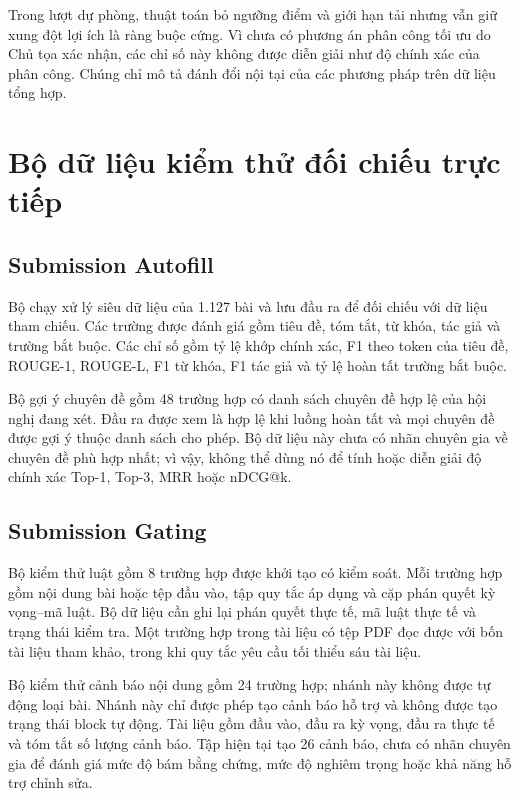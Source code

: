 Trong lượt dự phòng, thuật toán bỏ ngưỡng điểm và giới hạn tải nhưng vẫn giữ xung đột lợi ích là ràng buộc cứng. Vì chưa có phương án phân công tối ưu do Chủ tọa xác nhận, các chỉ số này không được diễn giải như độ chính xác của phân công. Chúng chỉ mô tả đánh đổi nội tại của các phương pháp trên dữ liệu tổng hợp.

\section{Bộ dữ liệu kiểm thử đối chiếu trực tiếp}
\label{appc:direct-fixtures}

\subsection{Submission Autofill}

Bộ chạy xử lý siêu dữ liệu của 1.127 bài và lưu đầu ra để đối chiếu với dữ liệu tham chiếu. Các trường được đánh giá gồm tiêu đề, tóm tắt, từ khóa, tác giả và trường bắt buộc. Các chỉ số gồm tỷ lệ khớp chính xác, F1 theo token của tiêu đề, ROUGE-1, ROUGE-L, F1 từ khóa, F1 tác giả và tỷ lệ hoàn tất trường bắt buộc.

Bộ gợi ý chuyên đề gồm 48 trường hợp có danh sách chuyên đề hợp lệ của hội nghị đang xét. Đầu ra được xem là hợp lệ khi luồng hoàn tất và mọi chuyên đề được gợi ý thuộc danh sách cho phép. Bộ dữ liệu này chưa có nhãn chuyên gia về chuyên đề phù hợp nhất; vì vậy, không thể dùng nó để tính hoặc diễn giải độ chính xác Top-1, Top-3, MRR hoặc nDCG@k.

\subsection{Submission Gating}

Bộ kiểm thử luật gồm 8 trường hợp được khởi tạo có kiểm soát. Mỗi trường hợp gồm nội dung bài hoặc tệp đầu vào, tập quy tắc áp dụng và cặp phán quyết kỳ vọng--mã luật. Bộ dữ liệu cần ghi lại phán quyết thực tế, mã luật thực tế và trạng thái kiểm tra. Một trường hợp trong tài liệu có tệp PDF đọc được với bốn tài liệu tham khảo, trong khi quy tắc yêu cầu tối thiểu sáu tài liệu.

Bộ kiểm thử cảnh báo nội dung gồm 24 trường hợp; nhánh này không được tự động loại bài. Nhánh này chỉ được phép tạo cảnh báo hỗ trợ và không được tạo trạng thái block tự động. Tài liệu gồm đầu vào, đầu ra kỳ vọng, đầu ra thực tế và tóm tắt số lượng cảnh báo. Tập hiện tại tạo 26 cảnh báo, chưa có nhãn chuyên gia để đánh giá mức độ bám bằng chứng, mức độ nghiêm trọng hoặc khả năng hỗ trợ chỉnh sửa.

